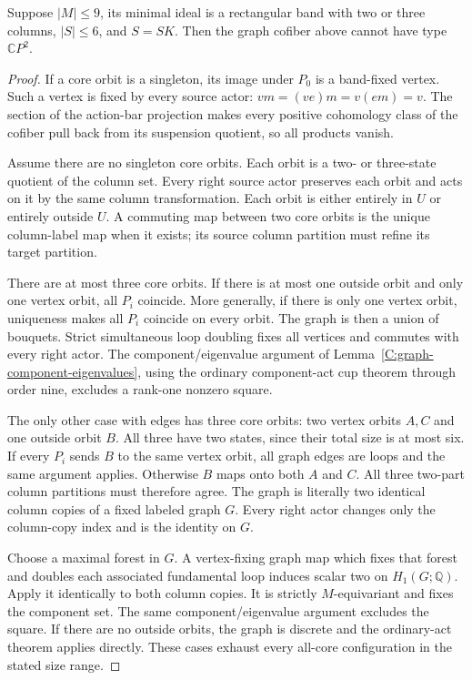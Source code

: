 \begin{lemma}
\label{C:eight-R4-six-all-core}
Suppose $|M|\leq9$, its minimal ideal is a rectangular band
with two or three columns, $|S|\leq6$, and $S=SK$.
Then the graph cofiber above cannot have type $\mathbb CP^2$.
\end{lemma}
\begin{proof}
If a core orbit is a singleton, its image under $P_0$ is
a band-fixed vertex.  Such a vertex is fixed by every
source actor: $vm=(ve)m=v(em)=v$.  The section of the
action-bar projection makes every positive cohomology class
of the cofiber pull back from its suspension quotient, so
all products vanish.

Assume there are no singleton core orbits.  Each orbit is
a two- or three-state quotient of the column set.  Every
right source actor preserves each orbit and acts on it by
the same column transformation.  Each orbit is either
entirely in $U$ or entirely outside $U$.  A commuting map
between two core orbits is the unique column-label map
when it exists; its source column partition must refine
its target partition.

There are at most three core orbits.  If there is at most
one outside orbit and only one vertex orbit, all $P_i$
coincide.  More generally, if there is only one vertex
orbit, uniqueness makes all $P_i$ coincide on every orbit.
The graph is then a union of bouquets.  Strict simultaneous
loop doubling fixes all vertices and commutes with every
right actor.  The component/eigenvalue argument of
Lemma~\ref{C:graph-component-eigenvalues}, using the ordinary
component-act cup theorem through order nine, excludes a
rank-one nonzero square.

The only other case with edges has three core orbits:
two vertex orbits $A,C$ and one outside orbit $B$.
All three have two states, since their total size is at
most six.  If every $P_i$ sends $B$ to the same vertex
orbit, all graph edges are loops and the same argument
applies.  Otherwise $B$ maps onto both $A$ and $C$.
All three two-part column partitions must therefore agree.
The graph is literally two identical column copies of
a fixed labeled graph $G$.  Every right actor changes
only the column-copy index and is the identity on $G$.

Choose a maximal forest in $G$.  A vertex-fixing graph map
which fixes that forest and doubles each associated
fundamental loop induces scalar two on $H_1(G;\mathbb Q)$.
Apply it identically to both column copies.  It is strictly
$M$-equivariant and fixes the component set.  The same
component/eigenvalue argument excludes the square.
If there are no outside orbits, the graph is discrete
and the ordinary-act theorem applies directly.  These
cases exhaust every all-core configuration in the stated
size range.
\end{proof}

